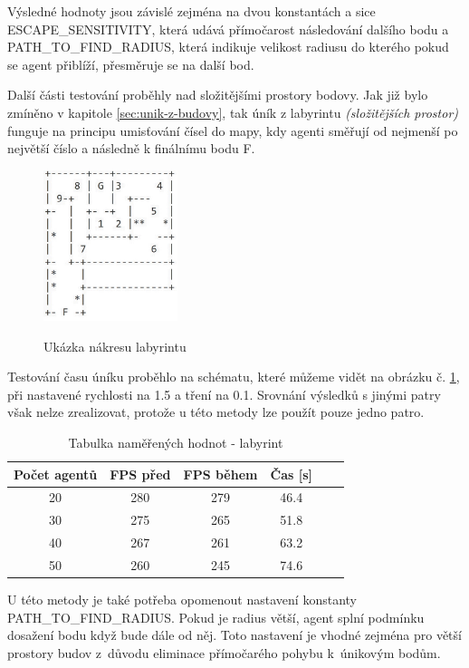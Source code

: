 \documentclass[czech,public,dept460,male,cpdeclaration]{diploma}
\begin{document}
Výsledné hodnoty jsou závislé zejména na dvou konstantách a sice ESCAPE\_SENSITIVITY, která udává přímočarost následování dalšího bodu a PATH\_TO\_FIND\_RADIUS, která indikuje velikost radiusu do kterého pokud se agent přiblíží, přesměruje se na další bod.

\newpage
Další části testování proběhly nad složitějšími prostory bodovy. Jak již bylo zmíněno v kapitole \ref{sec:unik-z-budovy}, tak úník z labyrintu \textit{(složitějších prostor)} funguje na principu umisťování čísel do mapy, kdy agenti směřují od nejmenší po největší číslo a následně k finálnímu bodu F.
\begin{figure}[H]\centering\includegraphics[width=0.35\textwidth]{Figures/map6.jpg}\label{fig:labyrinth}
	\caption{Ukázka nákresu labyrintu}
	\label{fig:labyrinth}
\end{figure}

Testování času úníku proběhlo na schématu, které můžeme vidět na obrázku č. \ref{fig:labyrinth}, při nastavené rychlosti na 1.5 a tření na 0.1. Srovnání výsledků s jinými patry však nelze zrealizovat, protože u této metody lze použít pouze jedno patro. 

\begin{table}[H]
	\centering
	\caption{Tabulka naměřených hodnot - labyrint}
	\label{tab:tablePC2}
	\renewcommand{\arraystretch}{1.0}
	\begin{tabular}{| c | c | c | c | c | c |}
		\hline
		Počet agentů & FPS před & FPS během & Čas [s]\\\hline
		20 & 280 & 279 & 46.4\\
		30 & 275 & 265 & 51.8\\
		40 & 267 & 261 & 63.2\\
		50 & 260 & 245 & 74.6\\
		\hline
	\end{tabular}
\end{table}

U této metody je také potřeba opomenout nastavení konstanty PATH\_TO\_FIND\_RADIUS. Pokud je radius větší, agent splní podmínku dosažení bodu když bude dále od něj. Toto nastavení je vhodné zejména pro větší prostory budov z~důvodu eliminace přímočarého pohybu k~únikovým bodům.
\end{document}
